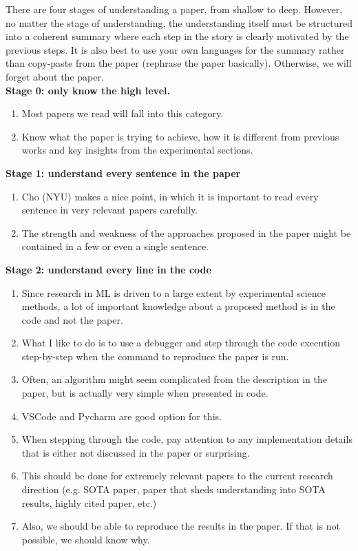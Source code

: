 \documentclass[11pt]{article}
\begin{document}
There are four stages of understanding a paper, from shallow to deep. However, no matter the stage of understanding, the understanding itself must be structured into a coherent summary where each step in the story is clearly motivated by the previous steps. It is also best to use your own languages for the summary rather than copy-paste from the paper (rephrase the paper basically). Otherwise, we will forget about the paper.
\\

\textbf{Stage 0: only know the high level.}

\begin{enumerate}
	\item Most papers we read will fall into this category.
	\item Know what the paper is trying to achieve, how it is different from previous works and key insights from the experimental sections.
\end{enumerate}

\textbf{Stage 1: understand every sentence in the paper}

\begin{enumerate}
	\item Cho (NYU) makes a nice point, in which it is important to read every sentence in very relevant papers carefully.
	\item The strength and weakness of the approaches proposed in the paper might be contained in a few or even a single sentence.
\end{enumerate}

\textbf{Stage 2: understand every line in the code}

\begin{enumerate}
	\item Since research in ML is driven to a large extent by experimental science methods, a lot of important knowledge about a proposed method is in the code and not the paper.
	\item What I like to do is to use a debugger and step through the code execution step-by-step when the command to reproduce the paper is run. 
	\item Often, an algorithm might seem complicated from the description in the paper, but is actually very simple when presented in code.
	\item VSCode and Pycharm are good option for this.
	\item When stepping through the code, pay attention to any implementation details that is either not discussed in the paper or surprising.
	\item This should be done for extremely relevant papers to the current research direction (e.g. SOTA paper, paper that sheds understanding into SOTA results, highly cited paper, etc.)
	\item Also, we should be able to reproduce the results in the paper. If that is not possible, we should know why.
\end{enumerate}
\end{document}
